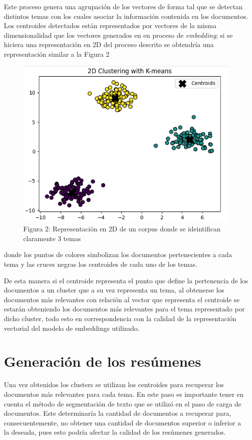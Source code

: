     Este proceso genera una agrupación de los vectores de forma tal que se detectan distintos temas con los cuales asociar la información contenida en los documentos. Los centroides detectados están representados por vectores de la misma dimensionalidad que los vectores generados en en proceso de \emph{embedding}; si se hiciera una representación en 2D del proceso descrito se obtendría una representación similar a la Figura 2 
    \begin{figure}
        \centering
        \includegraphics[scale = 0.7]{Figures/clustering.png}
        \caption*{Figura 2: Representación en 2D de un corpus donde se ideintifican claramente 3 temas}
    \end{figure}
    donde los puntos de colores simbolizan los documentos pertenecientes a cada tema y las cruces negras los centroides de cada uno de los temas.


    De esta manera si el centroide representa el punto que define la pertenencia de los documentos a un cluster que a su vez representa un tema, al obtenerse los documentos más relevantes con relación al vector que representa el centroide se estarán obteniendo los documentos más relevantes para el tema representado por dicho cluster, todo esto en correspondencia con la calidad de la representación vectorial del modelo de embeddings utilizado.
\section{Generación de los resúmenes}
    Una vez obtenidos los clusters se utilizan los centroides para recuperar los documentos más relevantes para cada tema. En este paso es importante tener en cuenta el método de segmentación de texto que se utilizó en el paso de carga de documentos. Este determinaría la cantidad de documentos a recuperar para, consecuentemente, no obtener una cantidad de documentos superior o inferior a la deseada, pues esto podría afectar la calidad de los resúmenes generados.
    
